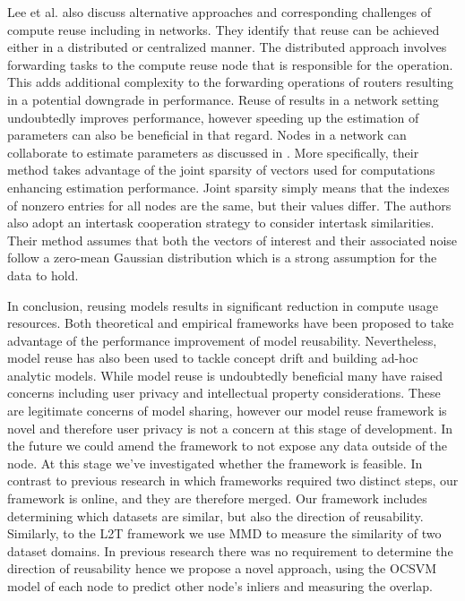 \documentclass{mpaper}
\begin{document}
Lee et al. \cite{ComputeReuse} also discuss alternative approaches and corresponding challenges of compute reuse including in networks. They identify that reuse can be achieved either in a distributed or centralized manner. The distributed approach involves forwarding tasks to the compute reuse node that is responsible for the operation. This adds additional complexity to the forwarding operations of routers resulting in a potential downgrade in performance. Reuse of results in a network setting undoubtedly improves performance, however speeding up the estimation of parameters can also be beneficial in that regard. Nodes in a network can collaborate to estimate parameters as discussed in \cite{DistributedEstimation}. More specifically, their method takes advantage of the joint sparsity of vectors used for computations enhancing estimation performance. Joint sparsity simply means that the indexes of nonzero entries for all nodes are the same, but their values differ.  The authors also adopt an intertask cooperation strategy to consider intertask similarities. Their method assumes that both the vectors of interest and their associated noise follow a zero-mean Gaussian distribution which is a strong assumption for the data to hold. 

In conclusion, reusing models results in significant reduction in compute usage resources. Both theoretical and empirical frameworks have been proposed to take advantage of the performance improvement of model reusability. Nevertheless, model reuse has also been used to tackle concept drift and building ad-hoc analytic models. While model reuse is undoubtedly beneficial many have raised concerns including user privacy and intellectual property considerations.  These are legitimate concerns of model sharing, however  our model reuse  framework is novel and therefore user privacy is not a concern at this stage of development. In the future we could amend the framework to not expose any data outside of the node. At this stage we've investigated whether the framework is feasible. In contrast to previous research in which frameworks required two distinct steps, our framework is online, and they are therefore merged. Our framework includes determining which datasets are similar, but also the direction of reusability.  Similarly, to the L2T \cite{L2T} framework we use MMD to measure the similarity of two dataset domains. In previous research there was no requirement to determine the direction of reusability hence we propose a novel approach, using the OCSVM model of each node to predict other node’s inliers and measuring the overlap.
\end{document}
